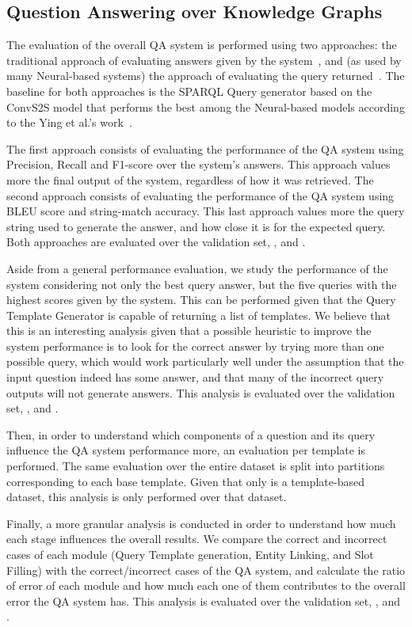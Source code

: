 \subsection{Question Answering over Knowledge Graphs}
\label{cap4:experimentalDesign/QAKG}
The evaluation of the overall QA system is performed using two approaches: the traditional 
approach of evaluating answers given by the system~\cite{qa:qald-Lopezetal2013}, and (as used by 
many Neural-based systems) the approach of evaluating the \SPARQL{} query 
returned~\cite{nmt:nl-to-sparql-Yin19}. The baseline for both approaches is the SPARQL Query 
generator based on the ConvS2S model that performs the best among the Neural-based models 
according to the Ying et al.’s work~\cite{nmt:nl-to-sparql-Yin19}.

The first approach consists of evaluating the performance of the QA system using Precision, 
Recall and F1-score over the system’s answers. This approach values more the final output of the 
system, regardless of how it was retrieved. The second approach consists of evaluating the 
performance of the QA system using BLEU score and string-match accuracy. This last approach 
values more the query string used to generate the answer, and how close it is for the expected 
query. Both approaches are evaluated over the \LCQuADtwo{} validation set, \QALDseven{}, and \WikiSPARQL{}.

Aside from a general performance evaluation, we study the performance of the system considering 
not only the best \SPARQL{} query answer, but the five \SPARQL{} queries with the highest scores given 
by the system. This can be performed given that the Query Template Generator is capable of 
returning a list of templates. We believe that this is an interesting analysis given that a 
possible heuristic to improve the system performance is to look for the correct answer by trying 
more than one possible \SPARQL{} query, which would work particularly well under the assumption 
that the input question indeed has some answer, and that many of the incorrect \SPARQL{} query 
outputs will not generate answers. This analysis is evaluated over the \LCQuADtwo{} validation set, 
\QALDseven{}, and \WikiSPARQL{}.

Then, in order to understand which components of a question and its \SPARQL{} query influence the 
QA system performance more, an evaluation per template is performed. The same evaluation over 
the entire dataset is split into partitions corresponding to each \LCQuADtwo{} base template. Given 
that only \LCQuADtwo{} is a template-based dataset, this analysis is only performed over that 
dataset.

Finally, a more granular analysis is conducted in order to understand how much each stage 
influences the overall results. We compare the correct and incorrect cases of each module (Query 
Template generation, Entity Linking, and Slot Filling) with the correct/incorrect cases of the 
QA system, and calculate the ratio of error of each module and how much each one of them 
contributes to the overall error the QA system has. This analysis is evaluated over the \LCQuADtwo{} 
validation set, \QALDseven{}, and \WikiSPARQL{}.
